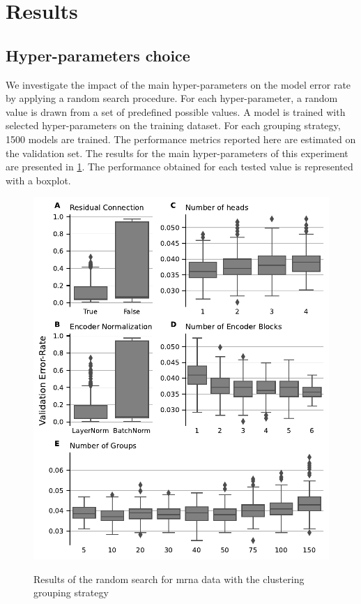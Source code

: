 \documentclass[../main.tex]{subfiles}
\begin{document}
\section{Results}

	\subsection{Hyper-parameters choice}

		We investigate the impact of the main hyper-parameters on the model error rate by applying a random search procedure.
		For each hyper-parameter, a random value is drawn from a set of predefined possible values.
		A model is trained with selected hyper-parameters on the training dataset.
		For each grouping strategy, 1500 models are trained.
		The performance metrics reported here are estimated on the validation set.
		The results for the main hyper-parameters of this experiment are presented in \cref{fig:hparams_search}.
		The performance obtained for each tested value is represented with a boxplot.

		\begin{figure}[htbp]
			\centering
			\begin{subcaptiongroup}
				\includegraphics[width=0.9\linewidth]{Beaude.168.fig.2.pdf}
				\label{fig:attomics_hparams_search_A}
				\label{fig:attomics_hparams_search_B}
				\label{fig:attomics_hparams_search_C}
				\label{fig:attomics_hparams_search_D}
				\label{fig:attomics_hparams_search_E}
			\end{subcaptiongroup}
			\caption{Results of the random search for \gls{mrna} data with the clustering grouping strategy}\label{fig:hparams_search}
		\end{figure}
\end{document}
